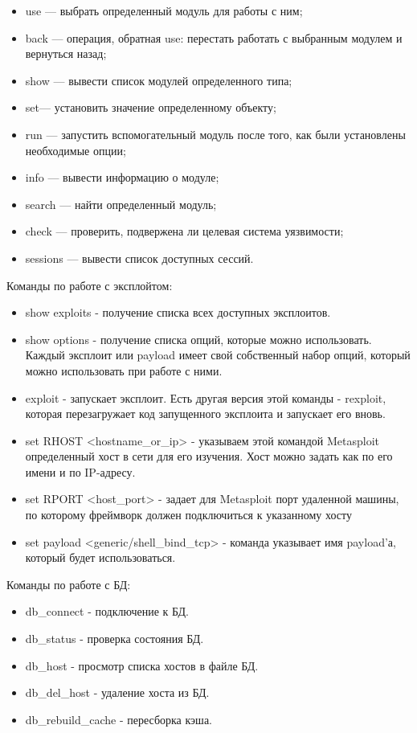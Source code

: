 \documentclass[10pt,a4paper]{report}
\begin{document}
\begin{itemize}
	\item use — выбрать определенный модуль для работы с ним;
	\item back — операция, обратная use: перестать работать с выбранным модулем и вернуться назад;
	\item show — вывести список модулей определенного типа;
	\item set— установить значение определенному объекту;
	\item run — запустить вспомогательный модуль после того, как были установлены необходимые опции;
	\item info — вывести информацию о модуле;
	\item search — найти определенный модуль;
	\item check — проверить, подвержена ли целевая система уязвимости;
	\item sessions — вывести список доступных сессий.
\end{itemize}

Команды по работе с эксплойтом:

\begin{itemize}
	\item show exploits - получение списка всех доступных эксплоитов.
	\item show options - получение списка опций, которые можно использовать. Каждый эксплоит или payload имеет свой собственный набор опций, который можно использовать при работе с ними.
	\item exploit - запускает эксплоит. Есть другая версия этой команды - rexploit, которая перезагружает код запущенного эксплоита и запускает его вновь.
	\item set RHOST <hostname\_or\_ip> - указываем этой командой Metasploit определенный хост в сети для его изучения. Хост можно задать как по его имени и по IP-адресу.
	\item set RPORT <host\_port> - задает для Metasploit порт удаленной машины, по которому фреймворк должен подключиться к указанному хосту
	\item set payload <generic/shell\_bind\_tcp> - команда указывает имя payload’а, который будет использоваться.
\end{itemize}

Команды по работе с БД:

\begin{itemize}
	\item db\_connect - подключение к БД.
	\item db\_status - проверка состояния БД.
	\item db\_host - просмотр списка хостов в файле БД.
	\item db\_del\_host - удаление хоста из БД.
	\item db\_rebuild\_cache - пересборка кэша.
\end{itemize}
	
\end{document}
